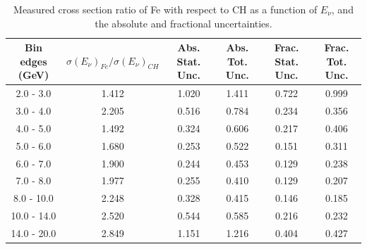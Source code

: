 \documentclass[aps,prl,twocolumn,superscriptaddress,nofootinbib]{revtex4-1}
\begin{document}
\begin{table}[h!]
  \centering
  \caption{Measured cross section ratio of Fe with respect to CH as a function
  of $E_{\nu}$,  and the absolute and fractional uncertainties.}
    \begin{tabular}{c||c||c|c||c|c}
      Bin edges (GeV) & $\sigma(E_{\nu})_{Fe}/\sigma(E_{\nu})_{CH}$ & Abs. Stat. Unc. & Abs. Tot. Unc. & Frac. Stat. Unc. & Frac. Tot. Unc. \\
      \hline\hline
        2.0 - 3.0 & 1.412 & 1.020 & 1.411 & 0.722 & 0.999 \\
        3.0 - 4.0 & 2.205 & 0.516 & 0.784 & 0.234 & 0.356 \\
        4.0 - 5.0 & 1.492 & 0.324 & 0.606 & 0.217 & 0.406 \\
        5.0 - 6.0 & 1.680 & 0.253 & 0.522 & 0.151 & 0.311 \\
        6.0 - 7.0 & 1.900 & 0.244 & 0.453 & 0.129 & 0.238 \\
        7.0 - 8.0 & 1.977 & 0.255 & 0.410 & 0.129 & 0.207 \\
       8.0 - 10.0 & 2.248 & 0.328 & 0.415 & 0.146 & 0.185 \\
      10.0 - 14.0 & 2.520 & 0.544 & 0.585 & 0.216 & 0.232 \\
      14.0 - 20.0 & 2.849 & 1.151 & 1.216 & 0.404 & 0.427 \\
    \end{tabular}
  \label{table:EnuXSecRatio_Fe}
\end{table}
\end{document}
